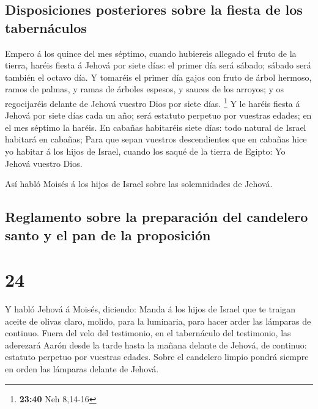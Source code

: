 \hypertarget{disposiciones-posteriores-sobre-la-fiesta-de-los-tabernuxe1culos}{%
\subsection{Disposiciones posteriores sobre la fiesta de los
tabernáculos}\label{disposiciones-posteriores-sobre-la-fiesta-de-los-tabernuxe1culos}}

 Empero á los quince del mes séptimo, cuando hubiereis
allegado el fruto de la tierra, haréis fiesta á Jehová por siete días:
el primer día será sábado; sábado será también el octavo día.
 Y tomaréis el primer día gajos con fruto de árbol hermoso,
ramos de palmas, y ramas de árboles espesos, y sauces de los arroyos; y
os regocijaréis delante de Jehová vuestro Dios por siete días.
\footnote{\textbf{23:40} Neh 8,14-16}  Y le haréis fiesta á
Jehová por siete días cada un año; será estatuto perpetuo por vuestras
edades; en el mes séptimo la haréis.  En cabañas habitaréis
siete días: todo natural de Israel habitará en cabañas; 
Para que sepan vuestros descendientes que en cabañas hice yo habitar á
los hijos de Israel, cuando los saqué de la tierra de Egipto: Yo Jehová
vuestro Dios.

 Así habló Moisés á los hijos de Israel sobre las
solemnidades de Jehová.

\hypertarget{reglamento-sobre-la-preparaciuxf3n-del-candelero-santo-y-el-pan-de-la-proposiciuxf3n}{%
\subsection{Reglamento sobre la preparación del candelero santo y el pan
de la
proposición}\label{reglamento-sobre-la-preparaciuxf3n-del-candelero-santo-y-el-pan-de-la-proposiciuxf3n}}

\hypertarget{section-23}{%
\section{24}\label{section-23}}

 Y habló Jehová á Moisés, diciendo:  Manda á los
hijos de Israel que te traigan aceite de olivas claro, molido, para la
luminaria, para hacer arder las lámparas de continuo.  Fuera
del velo del testimonio, en el tabernáculo del testimonio, las aderezará
Aarón desde la tarde hasta la mañana delante de Jehová, de continuo:
estatuto perpetuo por vuestras edades.  Sobre el candelero
limpio pondrá siempre en orden las lámparas delante de Jehová.

